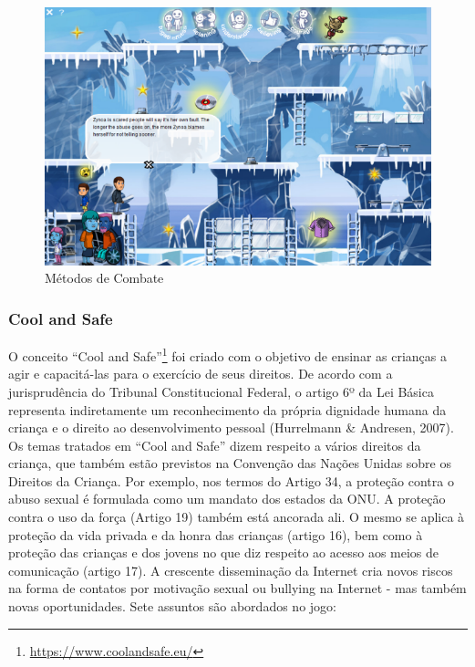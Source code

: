 \begin{figure}[htb]

	\caption{\label{fig:Riscos}Métodos de Combate}
  \begin{center}
    \includegraphics[width=0.5\linewidth]{./Figuras/Orbit/speak-up.png}
	\end{center}

\end{figure}





\newpage

\subsubsection{Cool and Safe}\label{sssec:CeS}


O conceito “Cool and Safe”\footnote{\url{https://www.coolandsafe.eu/}}  foi criado com o objetivo de ensinar as crianças a agir e capacitá-las para o exercício de seus direitos. De acordo com a jurisprudência do Tribunal Constitucional Federal, o artigo 6º da Lei Básica representa indiretamente um reconhecimento da própria dignidade humana da criança e o direito ao desenvolvimento pessoal (Hurrelmann \& Andresen, 2007). Os temas tratados em “Cool and Safe” dizem respeito a vários direitos da criança, que também estão previstos na Convenção das Nações Unidas sobre os Direitos da Criança. Por exemplo, nos termos do Artigo 34, a proteção contra o abuso sexual é formulada como um mandato dos estados da ONU. A proteção contra o uso da força (Artigo 19) também está ancorada ali. O mesmo se aplica à proteção da vida privada e da honra das crianças (artigo 16), bem como à proteção das crianças e dos jovens no que diz respeito ao acesso aos meios de comunicação (artigo 17). A crescente disseminação da Internet cria novos riscos na forma de contatos por motivação sexual ou bullying na Internet - mas também novas oportunidades. Sete assuntos são abordados no jogo:

